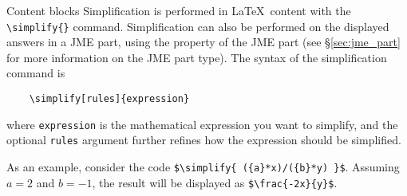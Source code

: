 \begin{chapter}{\label{cha:content_blocks}Content blocks}
  Simplification is performed in \LaTeX\ content with the \verb"\simplify{}"
  command.  Simplification can also be performed on the displayed answers in a
  JME part, using the  property of the JME part
  (see \S\ref{sec:jme_part} for more information on the JME part type).  The
  syntax of the simplification command is
  \begin{Verbatim}
    \simplify[rules]{expression}
  \end{Verbatim}
  where \verb"expression" is the mathematical expression you want to simplify,
  and the optional \verb"rules" argument further refines how the expression
  should be simplified.

  As an example, consider the code \verb"$\simplify{ ({a}*x)/({b}*y) }$".
  Assuming $a=2$ and $b=-1$, the result will be displayed as
  \verb"$\frac{-2x}{y}$".


\end{chapter}
